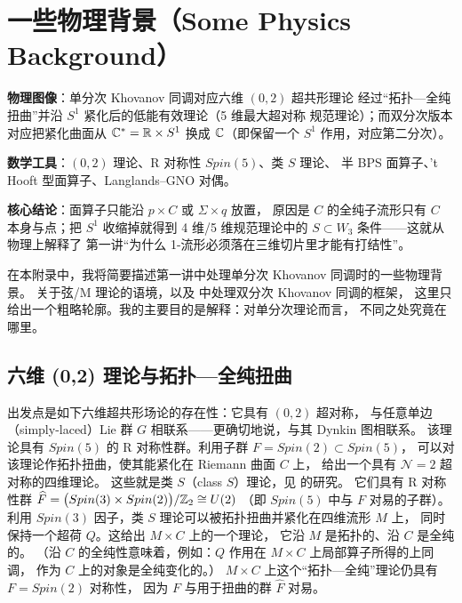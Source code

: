 \section{一些物理背景（Some Physics Background）}
\label{sec:appendix}

\begin{keypoints}
  \item \textbf{物理图像}：单分次 Khovanov 同调对应六维 $(0,2)$ 超共形理论
        经过“拓扑—全纯扭曲”并沿 $S^1$ 紧化后的低能有效理论（5 维最大超对称
        规范理论）；而双分次版本对应把紧化曲面从 $\mathbb{C}^{*}=\mathbb{R}\times S^1$
        换成 $\mathbb{C}$（即保留一个 $S^1$ 作用，对应第二分次）。
  \item \textbf{数学工具}：$(0,2)$ 理论、R 对称性 $Spin(5)$、类 $S$ 理论、
        半 BPS 面算子、't Hooft 型面算子、Langlands–GNO 对偶。
  \item \textbf{核心结论}：面算子只能沿 $p\times C$ 或 $\Sigma\times q$ 放置，
        原因是 $C$ 的全纯子流形只有 $C$ 本身与点；把 $S^1$ 收缩掉就得到
        4 维/5 维规范理论中的 $S\subset W_3$ 条件——这就从物理上解释了
        第一讲“为什么 1-流形必须落在三维切片里才能有打结性”。
\end{keypoints}

在本附录中，我将简要描述第一讲中处理单分次 Khovanov 同调时的一些物理背景。
关于弦/M 理论的语境，以及 \cite{W5branes} 中处理双分次 Khovanov 同调的框架，
这里只给出一个粗略轮廓。我的主要目的是解释：对单分次理论而言，
不同之处究竟在哪里。


\subsection{六维 (0,2) 理论与拓扑—全纯扭曲}

出发点是如下六维超共形场论的存在性：它具有 $(0,2)$ 超对称，
与任意单边（simply-laced）Lie 群 $G$ 相联系——更确切地说，与其 Dynkin 图相联系。
该理论具有 $Spin(5)$ 的 R 对称性群。利用子群 $F=Spin(2)\subset Spin(5)$，
可以对该理论作拓扑扭曲，使其能紧化在 Riemann 曲面 $C$ 上，
给出一个具有 $\mathcal{N}=2$ 超对称的四维理论。
这些就是类 $S$（class $S$）理论，见 \cite{GaiottoN2} 的研究。
它们具有 R 对称性群
$\widehat{F}=\bigl(Spin(3)\times Spin(2)\bigr)/\mathbb{Z}_2\cong U(2)$
（即 $Spin(5)$ 中与 $F$ 对易的子群）。
利用 $Spin(3)$ 因子，类 $S$ 理论可以被拓扑扭曲并紧化在四维流形 $M$ 上，
同时保持一个超荷 $Q$。这给出 $M\times C$ 上的一个理论，
它沿 $M$ 是拓扑的、沿 $C$ 是全纯的。
（沿 $C$ 的全纯性意味着，例如：$Q$ 作用在 $M\times C$ 上局部算子所得的上同调，
作为 $C$ 上的对象是全纯变化的。）
$M\times C$ 上这个“拓扑—全纯”理论仍具有 $F=Spin(2)$ 对称性，
因为 $F$ 与用于扭曲的群 $\widehat{F}$ 对易。

